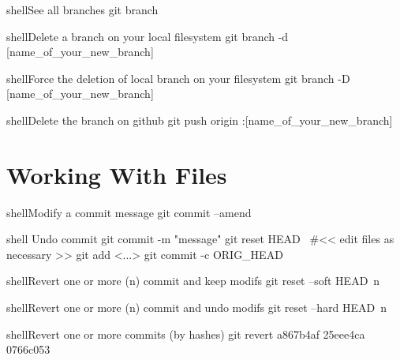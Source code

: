 \documentclass[10pt,a4paper]{article}
\begin{document}
\begin{multicols}{3}
\begin{codebox}{shell}{See all branches}
git branch

\end{codebox}

\begin{codebox}{shell}{Delete a branch on your local filesystem}
git branch -d [name_of_your_new_branch]

\end{codebox}

\begin{codebox}{shell}{Force the deletion of local branch on your filesystem}
git branch -D [name_of_your_new_branch]

\end{codebox}

\begin{codebox}{shell}{Delete the branch on github}
git push origin :[name_of_your_new_branch]

\end{codebox}

{\centering\section{Working With Files}}

\begin{codebox}{shell}{Modify a commit message}
git commit --amend

\end{codebox}

\begin{codebox}{shell}{}
Undo commit
git commit -m "message"
git reset HEAD~
#<< edit files as necessary >>
git add <...>
git commit -c ORIG_HEAD

\end{codebox}

\begin{codebox}{shell}{Revert one or more (n) commit and keep modifs}
git reset --soft HEAD~n

\end{codebox}

\begin{codebox}{shell}{Revert one or more (n) commit and undo modifs}
git reset --hard HEAD~n

\end{codebox}

\begin{codebox}{shell}{Revert one or more commits (by hashes)}
git revert a867b4af 25eee4ca 0766c053


\end{codebox}
\end{multicols}
\end{document}
